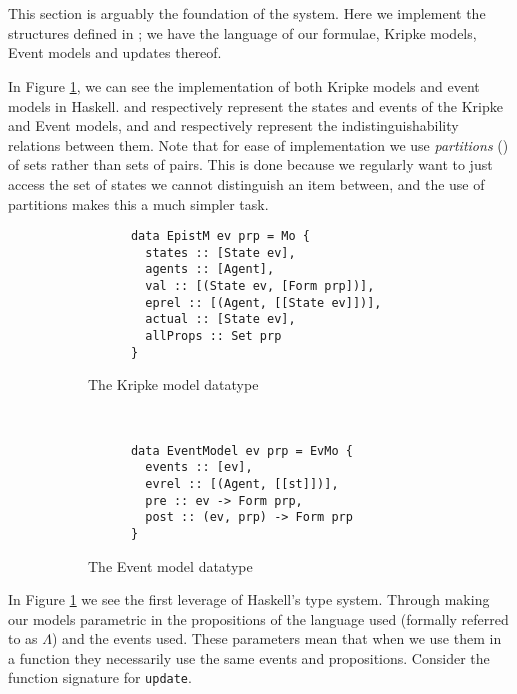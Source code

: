 \documentclass[10pt, a4paper]{report}
\begin{document}
\section{}

This section is arguably the foundation of the system. Here we implement the
structures defined in ; we have the language of our formulae,
Kripke models, Event models and updates thereof.  

In Figure \ref{fig:HaskellModels}, we can see the implementation of both Kripke
models and event models in Haskell.  and 
respectively represent the states and events of the Kripke and Event models, and
 and  respectively represent the
indistinguishability relations between them. Note that for ease of
implementation we use \emph{partitions} (\cite{EREL}) of sets rather than sets
of pairs. This is done because we regularly want to just access the set of
states we cannot distinguish an item between, and the use of partitions makes
this a much simpler task. 

\begin{figure}[h]
  \centering
  \begin{subfigure}[b]{0.5\textwidth}
    \begin{verbatim}
      data EpistM ev prp = Mo {
        states :: [State ev],                  
        agents :: [Agent],              
        val :: [(State ev, [Form prp])],         
        eprel :: [(Agent, [[State ev]])],
        actual :: [State ev],              
        allProps :: Set prp
      }
    \end{verbatim}
    \caption{The Kripke model datatype}
  \end{subfigure}%
~
  \begin{subfigure}[b]{0.5\textwidth}
    \begin{verbatim}
      data EventModel ev prp = EvMo {
        events :: [ev],
        evrel :: [(Agent, [[st]])],
        pre :: ev -> Form prp,
        post :: (ev, prp) -> Form prp
      }
    \end{verbatim}
    \caption{The Event model datatype}
  \end{subfigure}
  \caption{}
  \label{fig:HaskellModels}
\end{figure}

In Figure \ref{fig:HaskellModels} we see the first leverage of Haskell's type
system. Through making our models parametric in the propositions of the language
used (formally referred to as $\Lambda$) and the events used. These parameters
mean that when we use them in a function they necessarily use the same events
and propositions. Consider the function signature for \texttt{update}.
\end{document}
